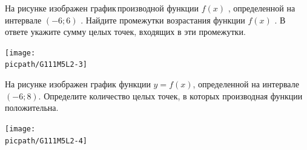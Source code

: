\begin{class}[number=3]
\begin{listofex}
		
		\item
		\begin{minipage}[t]{\bodywidth}
			На рисунке изображен график производной функции \(f(x)\) , определенной на интервале \( (-6;6) \) . Найдите промежутки возрастания функции \(f(x)\) . В ответе укажите сумму целых точек, входящих в эти промежутки.
		\end{minipage}
		\hspace{0.02\linewidth}
		\begin{minipage}[t]{\picwidth}
			\texttt{[image: \\picpath/G111M5L2-3]}
		\end{minipage}
		\item
		\begin{minipage}[t]{\bodywidth}
			На рисунке изображен график функции \(y = f(x)\), определенной на интервале \((-6; 8)\). Определите количество целых точек, в которых производная функции положительна.
		\end{minipage}
		\hspace{0.02\linewidth}
		\begin{minipage}[t]{\picwidth}
			\texttt{[image: \\picpath/G111M5L2-4]}

\end{minipage}
\end{listofex}
\end{class}
